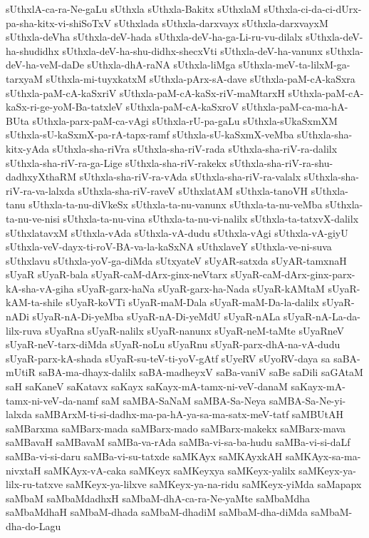 {sUthxlA-ca-ra-Ne-gaLu
sUthxla
sUthxla-Bakitx
sUthxlaM
sUthxla-ci-da-ci-dUrx-pa-sha-kitx-vi-shiSoTxV
sUthxlada
sUthxla-darxvayx
sUthxla-darxvayxM
sUthxla-deVha
sUthxla-deV-hada
sUthxla-deV-ha-ga-Li-ru-vu-dilalx
sUthxla-deV-ha-shudidhx
sUthxla-deV-ha-shu-didhx-shecxVti
sUthxla-deV-ha-vanunx
sUthxla-deV-ha-veM-daDe
sUthxla-dhA-raNA
sUthxla-liMga
sUthxla-meV-ta-lilxM-ga-tarxyaM
sUthxla-mi-tuyxkatxM
sUthxla-pArx-sA-dave
sUthxla-paM-cA-kaSxra
sUthxla-paM-cA-kaSxriV
sUthxla-paM-cA-kaSx-riV-maMtarxH
sUthxla-paM-cA-kaSx-ri-ge-yoM-Ba-tatxleV
sUthxla-paM-cA-kaSxroV
sUthxla-paM-ca-ma-hA-BUta
sUthxla-parx-paM-ca-vAgi
sUthxla-rU-pa-gaLu
sUthxla-sUkaSxmXM
sUthxla-sU-kaSxmX-pa-rA-tapx-ramf
sUthxla-sU-kaSxmX-veMba
sUthxla-sha-kitx-yAda
sUthxla-sha-riVra
sUthxla-sha-riV-rada
sUthxla-sha-riV-ra-dalilx
sUthxla-sha-riV-ra-ga-Lige
sUthxla-sha-riV-rakekx
sUthxla-sha-riV-ra-shu-dadhxyXthaRM
sUthxla-sha-riV-ra-vAda
sUthxla-sha-riV-ra-valalx
sUthxla-sha-riV-ra-va-lalxda
sUthxla-sha-riV-raveV
sUthxlatAM
sUthxla-tanoVH
sUthxla-tanu
sUthxla-ta-nu-diVkeSx
sUthxla-ta-nu-vanunx
sUthxla-ta-nu-veMba
sUthxla-ta-nu-ve-nisi
sUthxla-ta-nu-vina
sUthxla-ta-nu-vi-nalilx
sUthxla-ta-tatxvX-dalilx
sUthxlatavxM
sUthxla-vAda
sUthxla-vA-dudu
sUthxla-vAgi
sUthxla-vA-giyU
sUthxla-veV-dayx-ti-roV-BA-va-la-kaSxNA
sUthxlaveY
sUthxla-ve-ni-suva
sUthxlavu
sUthxla-yoV-ga-diMda
sUtxyateV
sUyAR-satxda
sUyAR-tamxnaH
sUyaR
sUyaR-bala
sUyaR-caM-dArx-ginx-neVtarx
sUyaR-caM-dArx-ginx-parx-kA-sha-vA-giha
sUyaR-garx-haNa
sUyaR-garx-ha-Nada
sUyaR-kAMtaM
sUyaR-kAM-ta-shile
sUyaR-koVTi
sUyaR-maM-Dala
sUyaR-maM-Da-la-dalilx
sUyaR-nADi
sUyaR-nA-Di-yeMba
sUyaR-nA-Di-yeMdU
sUyaR-nALa
sUyaR-nA-La-da-lilx-ruva
sUyaRna
sUyaR-nalilx
sUyaR-nanunx
sUyaR-neM-taMte
sUyaRneV
sUyaR-neV-tarx-diMda
sUyaR-noLu
sUyaRnu
sUyaR-parx-dhA-na-vA-dudu
sUyaR-parx-kA-shada
sUyaR-su-teV-ti-yoV-gAtf
sUyeRV
sUyoRV-daya
sa
saBA-mUtiR
saBA-ma-dhayx-dalilx
saBA-madheyxV
saBa-vaniV
saBe
saDili
saGAtaM
saH
saKaneV
saKatavx
saKayx
saKayx-mA-tamx-ni-veV-danaM
saKayx-mA-tamx-ni-veV-da-namf
saM
saMBA-SaNaM
saMBA-Sa-Neya
saMBA-Sa-Ne-yi-lalxda
saMBArxM-ti-si-dadhx-ma-pa-hA-ya-sa-ma-satx-meV-tatf
saMBUtAH
saMBarxma
saMBarx-mada
saMBarx-mado
saMBarx-makekx
saMBarx-mava
saMBavaH
saMBavaM
saMBa-va-rAda
saMBa-vi-sa-ba-hudu
saMBa-vi-si-daLf
saMBa-vi-si-daru
saMBa-vi-su-tatxde
saMKAyx
saMKAyxkAH
saMKAyx-sa-ma-nivxtaH
saMKAyx-vA-caka
saMKeyx
saMKeyxya
saMKeyx-yalilx
saMKeyx-ya-lilx-ru-tatxve
saMKeyx-ya-lilxve
saMKeyx-ya-na-ridu
saMKeyx-yiMda
saMapapx
saMbaM
saMbaMdadhxH
saMbaM-dhA-ca-ra-Ne-yaMte
saMbaMdha
saMbaMdhaH
saMbaM-dhada
saMbaM-dhadiM
saMbaM-dha-diMda
saMbaM-dha-do-Lagu
}
